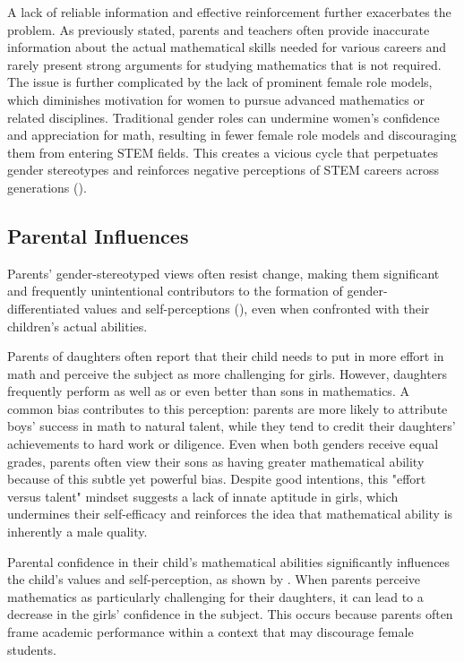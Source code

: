 A lack of reliable information and effective reinforcement further exacerbates the problem. As previously stated, parents and teachers often provide inaccurate information about the actual mathematical skills needed for various careers and rarely present strong arguments for studying mathematics that is not required. The issue is further complicated by the lack of prominent female role models, which diminishes motivation for women to pursue advanced mathematics or related disciplines. Traditional gender roles can undermine women's confidence and appreciation for math, resulting in fewer female role models and discouraging them from entering STEM fields. This creates a vicious cycle that perpetuates gender stereotypes and reinforces negative perceptions of STEM careers across generations (\cite{eccles1989}).
\subsection{Parental Influences}
Parents' gender-stereotyped views often resist change, making them significant and frequently unintentional contributors to the formation of gender-differentiated values and self-perceptions (\cite{Gunderson2012}), even when confronted with their children's actual abilities. 

Parents of daughters often report that their child needs to put in more effort in math and perceive the subject as more challenging for girls. However, daughters frequently perform as well as or even better than sons in mathematics. A common bias contributes to this perception: parents are more likely to attribute boys' success in math to natural talent, while they tend to credit their daughters' achievements to hard work or diligence. Even when both genders receive equal grades, parents often view their sons as having greater mathematical ability because of this subtle yet powerful bias. Despite good intentions, this "effort versus talent" mindset suggests a lack of innate aptitude in girls, which undermines their self-efficacy and reinforces the idea that mathematical ability is inherently a male quality.

Parental confidence in their child's mathematical abilities significantly influences the child's values and self-perception, as shown by \textcite{Jacobs1991}. When parents perceive mathematics as particularly challenging for their daughters, it can lead to a decrease in the girls' confidence in the subject. This occurs because parents often frame academic performance within a context that may discourage female students. 

